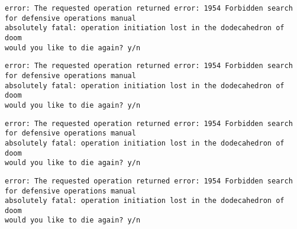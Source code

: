 \begin{verbatim}
error: The requested operation returned error: 1954 Forbidden search for defensive operations manual
absolutely fatal: operation initiation lost in the dodecahedron of doom
would you like to die again? y/n
\end{verbatim}

\begin{verbatim}
error: The requested operation returned error: 1954 Forbidden search for defensive operations manual
absolutely fatal: operation initiation lost in the dodecahedron of doom
would you like to die again? y/n
\end{verbatim}

\begin{verbatim}
error: The requested operation returned error: 1954 Forbidden search for defensive operations manual
absolutely fatal: operation initiation lost in the dodecahedron of doom
would you like to die again? y/n
\end{verbatim}

\begin{verbatim}
error: The requested operation returned error: 1954 Forbidden search for defensive operations manual
absolutely fatal: operation initiation lost in the dodecahedron of doom
would you like to die again? y/n
\end{verbatim}
